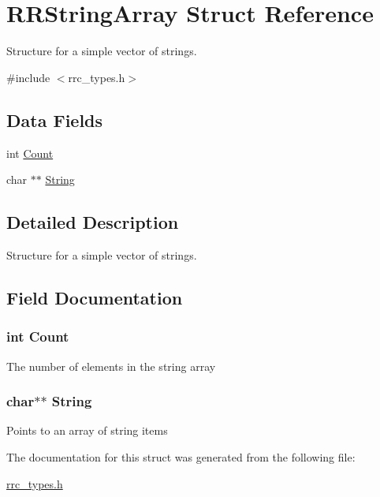 \hypertarget{struct_r_r_string_array}{\section{R\-R\-String\-Array Struct Reference}
\label{struct_r_r_string_array}
}


Structure for a simple vector of strings.  




{\ttfamily \#include $<$rrc\-\_\-types.\-h$>$}

\subsection*{Data Fields}
\begin{DoxyCompactItemize}
\item 
int \hyperlink{struct_r_r_string_array_aad462966ed963f892117056de1eba502}{Count}
\item 
char $\ast$$\ast$ \hyperlink{struct_r_r_string_array_acdbc34377baf3e52d9044aada0f2f511}{String}
\end{DoxyCompactItemize}


\subsection{Detailed Description}
Structure for a simple vector of strings. 

\subsection{Field Documentation}
\hypertarget{struct_r_r_string_array_aad462966ed963f892117056de1eba502}{
\subsubsection[{Count}]{\setlength{\rightskip}{0pt plus 5cm}int Count}}\label{struct_r_r_string_array_aad462966ed963f892117056de1eba502}
The number of elements in the string array \hypertarget{struct_r_r_string_array_acdbc34377baf3e52d9044aada0f2f511}{
\subsubsection[{String}]{\setlength{\rightskip}{0pt plus 5cm}char$\ast$$\ast$ String}}\label{struct_r_r_string_array_acdbc34377baf3e52d9044aada0f2f511}
Points to an array of string items 

The documentation for this struct was generated from the following file\-:\begin{DoxyCompactItemize}
\item 
\hyperlink{rrc__types_8h}{rrc\-\_\-types.\-h}\end{DoxyCompactItemize}
